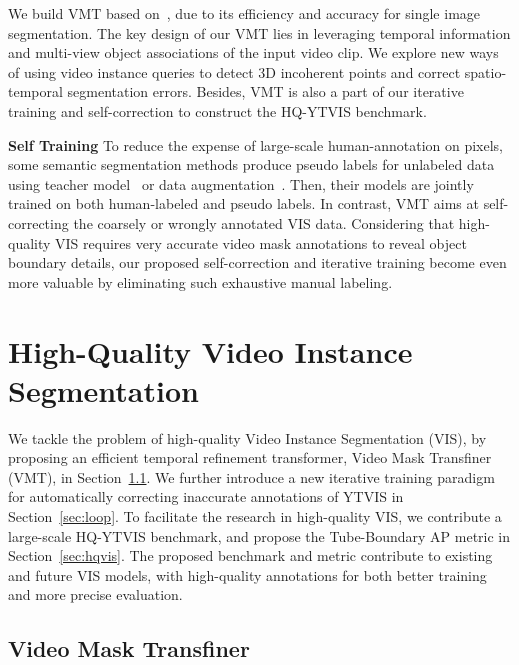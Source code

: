 \documentclass[runningheads]{llncs}
\newcommand{\parsection}[1]{\textbf{#1} }
\begin{document}
We build VMT based on~\cite{transfiner}, due to its efficiency and accuracy for single image segmentation. The key design of our VMT lies in leveraging temporal information and multi-view object associations of the input video clip. We explore new ways of using video instance queries to detect 3D incoherent points and correct spatio-temporal segmentation errors. Besides, VMT is also a part of our iterative training and self-correction to construct the HQ-YTVIS benchmark. 





\parsection{Self Training}
To reduce the expense of large-scale human-annotation on pixels, some semantic segmentation methods produce pseudo labels for unlabeled data using teacher model~\cite{zhu2020improving,chen2020naive} or data augmentation~\cite{zou2020pseudoseg}. Then, their models are jointly trained on both human-labeled and pseudo labels. In contrast, VMT aims at self-correcting the coarsely or wrongly annotated VIS data. Considering that high-quality VIS requires very accurate video mask annotations to reveal object boundary details, our proposed self-correction and iterative training become even more valuable by eliminating such exhaustive manual labeling.

%
 
\section{High-Quality Video Instance Segmentation}

We tackle the problem of high-quality Video Instance Segmentation (VIS), by proposing an efficient temporal refinement transformer, Video Mask Transfiner (VMT), in Section~\ref{sec:VMT}. We further introduce a new iterative training paradigm for automatically correcting  inaccurate annotations of YTVIS in Section~\ref{sec:loop}. 
To facilitate the research in high-quality VIS, we contribute a large-scale HQ-YTVIS benchmark, and propose the Tube-Boundary AP metric in Section~\ref{sec:hqvis}. The proposed benchmark and metric contribute to existing and future VIS models, with high-quality annotations for both better training and more precise evaluation.

\subsection{Video Mask Transfiner}
\label{sec:VMT}
\end{document}
